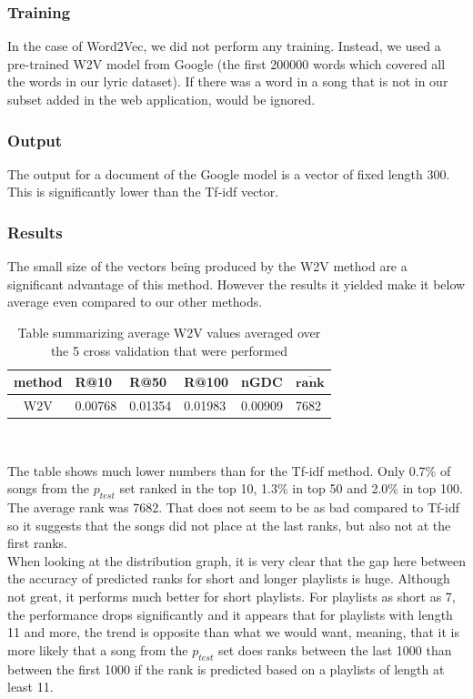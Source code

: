 \subsubsection{Training}
In the case of Word2Vec, we did not perform any training. Instead, we used a pre-trained W2V model from Google (the first 200000 words which covered all the words in our lyric dataset). If there was a word in a song that is not in our subset added in the web application, would be ignored.

\subsubsection{Output}
The output for a document of the Google model is a vector of fixed length 300. This is significantly lower than the Tf-idf vector.

\subsubsection{Results}
The small size of the vectors being produced by the W2V method are a significant advantage of this method. However the results it yielded make it below average even compared to our other methods.

\begin{table}[hbt!]
\centering
\renewcommand{\arraystretch}{1.5}
\begin{tabu} to 1\textwidth { | c || X[c] | X[c] | X[c] | X[c] | X[c] |}
 \hline
 \textbf{method} & \textbf{R@10} & \textbf{R@50} & \textbf{R@100} & \textbf{nGDC} & $ \boldsymbol{\overline{rank}} $ \\
 \hline
 \hline
 W2V & 0.00768 & 0.01354 & 0.01983 & 0.00909 & 7682 \\
 \hline
\end{tabu} \\
\caption{Table summarizing average W2V values averaged over the 5 cross validation that were performed}
\label{table:2}
\end{table}

The table shows much lower numbers than for the Tf-idf method. Only 0.7\% of songs from the $ p_{test} $ set ranked in the top 10, 1.3\% in top 50 and 2.0\% in top 100. The average rank was 7682. That does not seem to be as bad compared to Tf-idf so it suggests that the songs did not place at the last ranks, but also not at the first ranks. \\
When looking at the distribution graph, it is very clear that the gap here between the accuracy of predicted ranks for short and longer playlists is huge. Although not great, it performs much better for short playlists. For playlists as short as 7, the performance drops significantly and it appears that for playlists with length 11 and more, the trend is opposite than what we would want, meaning, that it is more likely that a song from the $p_{test}$ set does ranks between the last 1000 than between the first 1000 if the rank is predicted based on a playlists of length at least 11.

